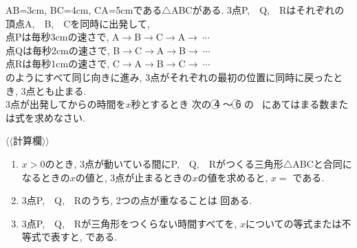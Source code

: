 \documentclass[dvipdfmx, titlepage, 11pt]{jsarticle}
\newcommand{\ncircle}[1]{\textcircled{\scriptsize #1}}
\newcommand{\nbox}[1]{\fbox{\hspace{5pt} \textcircled{\scriptsize #1}\hspace{5pt} }}
\newcommand{\ebox}{\fbox{　\hspace{10pt} }}
\begin{document}
\begin{multicols}{2}
  \noindent {}\hspace{10pt} AB=3cm, BC=4cm, CA=5cmである$\triangle$ABCがある. 3点P,\ \ Q,\ \ Rはそれぞれの頂点A,\ \ B,\ \ Cを同時に出発して,\\
  \hspace{0.6cm} 点Pは毎秒3cmの速さで, A$\to$B$\to$C$\to$A$\to\ \cdots$\\
  \hspace{0.6cm} 点Qは毎秒2cmの速さで, B$\to$C$\to$A$\to$B$\to\ \cdots$\\
  \hspace{0.6cm} 点Rは毎秒1cmの速さで, C$\to$A$\to$B$\to$C$\to\ \cdots$\\
  のようにすべて同じ向きに進み, 3点がそれぞれの最初の位置に同時に戻ったとき, 3点とも止まる.\\
  3点が出発してからの時間を$x$秒とするとき 次の \ncircle{4} 〜 \ncircle{6} の \ebox \ にあてはまる数または式を求めなさい.
  \begin{center}
    $\langle\langle$計算欄$\rangle\rangle$\\[0.1cm]
    
  \end{center}
\end{multicols}
\begin{enumerate}[(1)]
\item $x>0$のとき, 3点が動いている間にP,\ \ Q,\ \ Rがつくる三角形$\triangle$ABCと合同になるときの$x$の値と, 3点が止まるときの$x$の値を求めると, $x=$ \nbox{4} である.\\[3cm]
\item 3点P,\ \ Q,\ \ Rのうち, 2つの点が重なることは \nbox{5} 回ある.\\[3cm]
\item 3点P,\ \ Q,\ \ Rが三角形をつくらない時間すべてを, $x$についての等式または不等式で表すと, \nbox{6} である.
\end{enumerate}
\newpage
\end{document}

